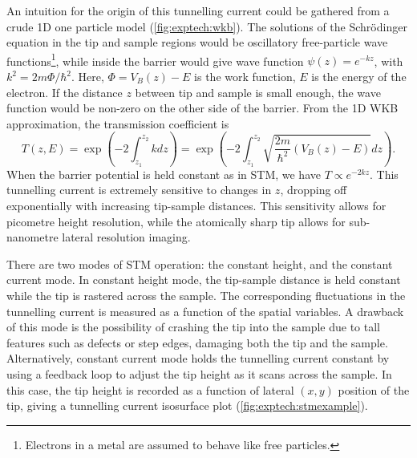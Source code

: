 \begin{figure} [h]
    \centering
    \caption{}
    \label{fig:exptech:stmsetup}
\end{figure}

\sloppy An intuition for the origin of this tunnelling current could be gathered from a crude \ac{1D} one particle model (\autoref{fig:exptech:wkb}). The solutions of the Schr\"odinger equation in the tip and sample regions would be oscillatory free-particle wave functions\footnote{Electrons in a metal are assumed to behave like free particles.}, while inside the barrier would give wave function $\psi(z) = e^{-kz}$, with $k^2 = 2m\Phi/\hbar^2$. Here, $\Phi = V_B(z) - E$ is the work function, $E$ is the energy of the electron. If the distance $z$ between tip and sample is small enough, the wave function would be non-zero on the other side of the barrier. From the \ac{1D} \ac{WKB} approximation, the transmission coefficient is
\begin{equation} \label{eq:exptech:transfcn}
T(z,E) = \exp{\left(-2\int_{z_1} ^{z_2} k dz \right)} = \exp{\left(-2  \int_{z_1}^{z_2} \sqrt{\frac{2m}{\hbar^2}(V_B(z) - E)} dz \right)}.
\end{equation}
When the barrier potential  is held constant as in \ac{STM}, we have $T \propto e^{-2kz}$. This tunnelling current is extremely sensitive to changes in $z$, dropping off exponentially with increasing tip-sample distances. This sensitivity allows for picometre height resolution, while the atomically sharp tip allows for sub-nanometre lateral resolution imaging.


\begin{figure} [h]
    \centering
    \caption{}
    \label{fig:exptech:wkb}
\end{figure}


There are two modes of \ac{STM} operation: the constant height, and the constant current mode. In constant height mode, the tip-sample distance is held constant while the tip is rastered across the sample. The corresponding fluctuations in the tunnelling current is measured as a function of the spatial variables. A drawback of this mode is the possibility of crashing the tip into the sample due to tall features such as defects or step edges, damaging both the tip and the sample. Alternatively, constant current mode holds the tunnelling current constant by using a feedback loop to adjust the tip height as it scans across the sample. In this case, the tip height is recorded as a function of lateral $(x,y)$ position of the tip, giving a tunnelling current isosurface plot (\autoref{fig:exptech:stmexample}).

